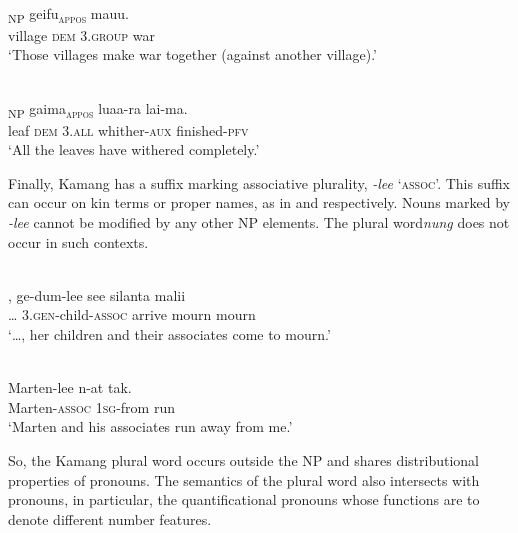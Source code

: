 \ea%
\label{ex:9:42}
 \\
\textsubscript{\textsc{NP}} {geifu}\textsubscript{\textsc{appos}}   {mauu.}\\
  village \textsc{dem} 3.\textsc{group} war  \\
\glt `Those villages make war together (against another village).'
\z






\ea%
\label{ex:9:43}
 \\
\textsubscript{NP} {gaima}\textsubscript{\textsc{appos}} luaa-ra lai-ma{.}\\
    leaf \textsc{dem}   3.\textsc{all} whither-\textsc{aux} finished-\textsc{pfv}\\
\glt `All the leaves have withered completely.'
\z






Finally, Kamang has a suffix marking associative plurality, \textit{-lee} `\textsc{assoc}'. This suffix can occur on kin terms or proper names, as in  and  respectively. Nouns marked by \textit{-lee} cannot be modified by any other NP elements. The plural word\textit{nung} does not occur in such contexts.


\ea%
\label{ex:9:44}
 \\
\gll  {\dots},   ge-dum-lee see silanta malii \\
  {\dots} 3.\textsc{gen}-child-\textsc{assoc} arrive mourn mourn \\
\glt `{\dots}, her children and their associates come to mourn.'
\z







\ea%
\label{ex:9:45}
 \\
\gll  Marten-lee n-at tak.  \\
  Marten-\textsc{assoc} 1\textsc{sg}-from run   \\
\glt `Marten and his associates run away from me.'
\z






So, the Kamang plural word occurs outside the NP and shares distributional properties of pronouns. The semantics of the plural word also intersects with pronouns, in particular, the quantificational pronouns whose functions are to denote different number features.

